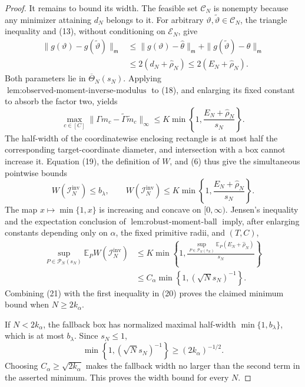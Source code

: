\documentclass{article}
\begin{document}
\begin{proof}
It remains to bound its width.  The feasible set \(\mathcal C_N\) is nonempty because any minimizer attaining \(d_N\) belongs to it.  For arbitrary \(\vartheta,\widetilde\vartheta\in\mathcal C_N\), the triangle inequality and (13), without conditioning on \(\mathcal E_N\), give
\[
 \begin{aligned}
 \|g(\vartheta)-g(\widetilde\vartheta)\|_{\mathsf m}
 &\leq\|g(\vartheta)-\widehat\theta\|_{\mathsf m}
 +\|g(\widetilde\vartheta)-\widehat\theta\|_{\mathsf m}\\
 &\leq2(d_N+\widehat\rho_N)
 \leq2(E_N+\widehat\rho_N).
 \end{aligned}
 \tag{18}
\]
Both parameters lie in \(\overline\Theta_N(s_N)\).  Applying \(\operatorname{lem:observed\text{-}moment\text{-}inverse\text{-}modulus}\) to (18), and enlarging its fixed constant to absorb the factor two, yields
\[
 \max_{c\in[C]}
 \|\Gamma m_c-\widetilde\Gamma\widetilde m_c\|_\infty
 \leq K\min\!\left\{1,
 \frac{E_N+\widehat\rho_N}{s_N}\right\}.
 \tag{19}
\]
The half-width of the coordinatewise enclosing rectangle is at most half the corresponding target-coordinate diameter, and intersection with a box cannot increase it.  Equation (19), the definition of \(W\), and (6) thus give the simultaneous pointwise bounds
\[
 W(\mathcal I_N^{\mathrm{inv}})\leq b_\lambda,
 \qquad
 W(\mathcal I_N^{\mathrm{inv}})
 \leq K\min\!\left\{1,
 \frac{E_N+\widehat\rho_N}{s_N}\right\}.
 \tag{20}
\]
The map \(x\mapsto\min\{1,x\}\) is increasing and concave on \([0,\infty)\).  Jensen's inequality and the expectation conclusion of \(\operatorname{lem:robust\text{-}moment\text{-}ball}\) imply, after enlarging constants depending only on \(\alpha\), the fixed primitive radii, and \((T,C)\),
\[
 \begin{aligned}
 \sup_{P\in\mathcal P_N(s_N)}
 \mathbb E_P W(\mathcal I_N^{\mathrm{inv}})
 &\leq K\min\!\left\{1,
 \frac{\sup_{P\in\mathcal P_N(s_N)}
 \mathbb E_P(E_N+\widehat\rho_N)}{s_N}\right\}\\
 &\leq C_\alpha\min\!\left\{1,(\sqrt N s_N)^{-1}\right\}.
 \end{aligned}
 \tag{21}
\]
Combining (21) with the first inequality in (20) proves the claimed minimum bound when \(N\geq2k_\alpha\).

If \(N<2k_\alpha\), the fallback box has normalized maximal half-width \(\min\{1,b_\lambda\}\), which is at most \(b_\lambda\).  Since \(s_N\leq1\),
\[
 \min\!\left\{1,(\sqrt N s_N)^{-1}\right\}
 \geq(2k_\alpha)^{-1/2}.
 \tag{22}
\]
Choosing \(C_\alpha\geq\sqrt{2k_\alpha}\) makes the fallback width no larger than the second term in the asserted minimum.  This proves the width bound for every \(N\).


\end{proof}
\end{document}

